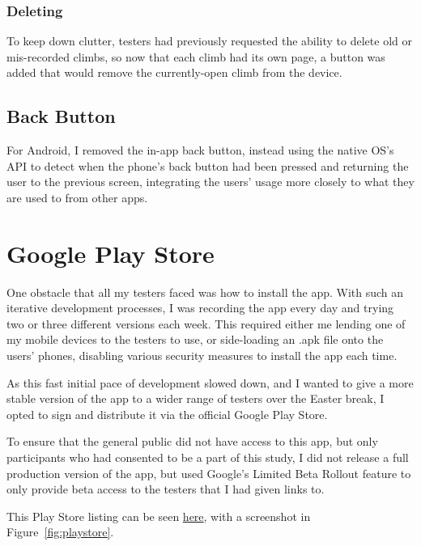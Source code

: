 \subsubsection{Deleting}
To keep down clutter, testers had previously requested the ability to delete old or mis-recorded climbs, so now that each climb had its own page, a button was added that would remove the currently-open climb from the device.


\subsection{Back Button}
For Android, I removed the in-app back button, instead using the native OS's API to detect when the phone's back button had been pressed and returning the user to the previous screen, integrating the users' usage more closely to what they are used to from other apps.




\section{Google Play Store}
One obstacle that all my testers faced was how to install the app.
With such an iterative development processes, I was recording the app every day and trying two or three different versions each week.
This required either me lending one of my mobile devices to the testers to use, or side-loading an .apk file onto the users' phones, disabling various security measures to install the app each time.

As this fast initial pace of development slowed down, and I wanted to give a more stable version of the app to a wider range of testers over the Easter break, I opted to sign and distribute it via the official Google Play Store.

To ensure that the general public did not have access to this app, but only participants who had consented to be a part of this study, I did not release a full production version of the app, but used Google's Limited Beta Rollout feature to only provide beta access to the testers that I had given links to.

This Play Store listing can be seen \href{https://play.google.com/store/apps/details?id=com.lukestorry.augKlimb}{here}, with a screenshot in Figure~\ref{fig:playstore}.

